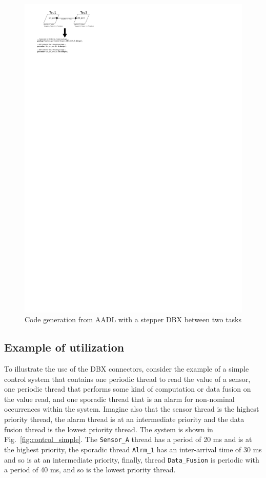 \begin{figure}
\centering
\includegraphics[scale=1.8]{figs/transform}
\caption{Code generation from AADL with a stepper DBX between two
  tasks}
\label{fig:transformation}
\end{figure}

\subsection{Example of utilization}
To illustrate the use of the DBX connectors, consider the example of a
simple control system that contains one periodic thread to read the
value of a sensor, one periodic thread that performs some kind of
computation or data fusion on the value read, and one sporadic thread
that is an alarm for non-nominal occurrences within the
system. Imagine also that the sensor thread is the highest priority
thread, the alarm thread is at an intermediate priority and the data
fusion thread is the lowest priority thread. The system is shown in
Fig.~\ref{fig:control_simple}. The \texttt{Sensor\_A} thread has a
period of 20 ms and is at the highest priority, the sporadic thread
\texttt{Alrm\_1} has an inter-arrival time of 30 ms and so is at an
intermediate priority, finally, thread \texttt{Data\_Fusion} is
periodic with a period of 40 ms, and so is the lowest priority thread.

